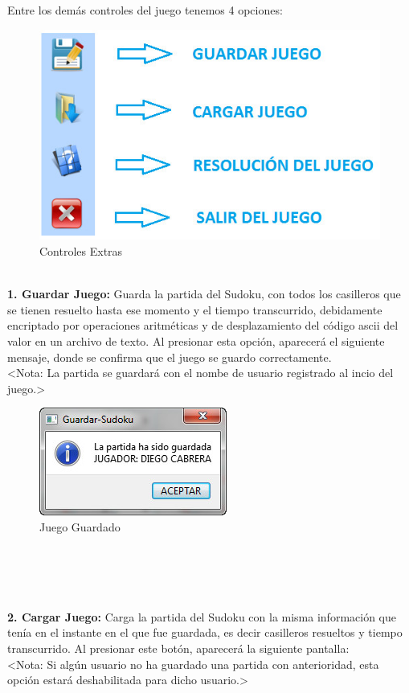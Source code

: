 \ \\ \ \\ \ \\ \ \\ \ \\
Entre los demás controles del juego tenemos 4 opciones:

\begin{figure}[htbp]
\begin{center}
\includegraphics[width=.60\textwidth]{./imagenes/Controles2.png}
\caption{Controles Extras}
\label{Controles Extras}
\end{center}
\end{figure} 

\ \\ \textbf{1. Guardar Juego:} Guarda la partida del Sudoku, con todos los casilleros que se tienen resuelto hasta ese momento y el tiempo transcurrido, debidamente encriptado por operaciones aritm\'eticas y de desplazamiento del c\'odigo ascii del valor en un archivo de texto. Al presionar esta opción, aparecerá el siguiente mensaje, donde se confirma que el juego se guardo correctamente. \\
<Nota: La partida se guardará con el nombe de usuario registrado al incio del juego.>
  
\begin{figure}[htbp]
\begin{center}
\includegraphics[width=.40\textwidth]{./imagenes/Guardar.png}
\caption{Juego Guardado}
\label{Juego Guardado}
\end{center}
\end{figure} 

\ \\ \ \\ \ \ \\ \ \\ 
\textbf{2. Cargar Juego:} Carga la partida del Sudoku con la misma información que tenía en el instante en el que fue guardada, es decir casilleros resueltos y tiempo transcurrido. Al presionar este botón, aparecerá la siguiente pantalla: \\ 
<Nota: Si algún usuario no ha guardado una partida con anterioridad, esta opción estará deshabilitada para dicho usuario.>


